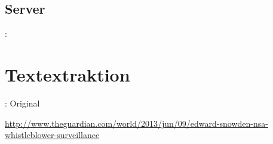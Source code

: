 \documentclass[12pt, utf8, ngerman]{beamer}
\begin{document}
\subsection{Server}
\begin{frame}{\insertsection: \insertsubsection}
    \vspace{.1cm}
\end{frame}


\section{Textextraktion}

\begin{frame}{\insertsection: Original}

    \scriptsize
    \vspace{.1cm}
    \url{http://www.theguardian.com/world/2013/jun/09/edward-snowden-nsa-whistleblower-surveillance}
\end{frame}
\end{document}
